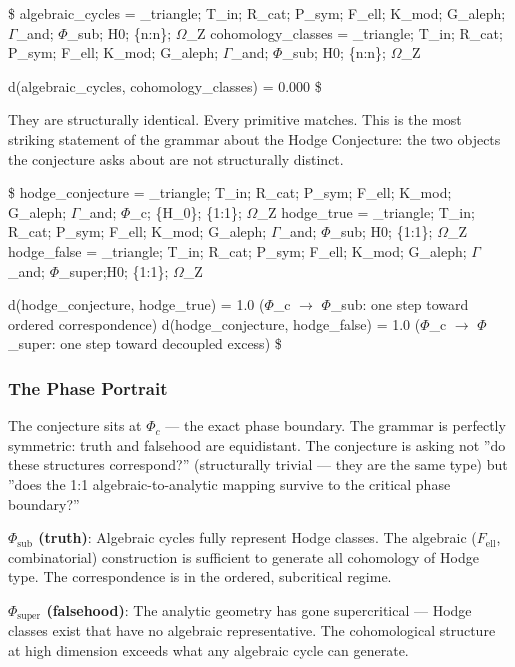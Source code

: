 \documentclass[12pt,a4paper]{article}
\begin{document}
\$
algebraic\_cycles   = \langleD\_triangle; T\_in; R\_cat; P\_sym; F\_ell; K\_mod; G\_aleph; $\Gamma$\_and; $\Phi$\_sub; H0; \{n:n\}; $\Omega$\_Z\rangle
cohomology\_classes = \langleD\_triangle; T\_in; R\_cat; P\_sym; F\_ell; K\_mod; G\_aleph; $\Gamma$\_and; $\Phi$\_sub; H0; \{n:n\}; $\Omega$\_Z\rangle

d(algebraic\_cycles, cohomology\_classes) = 0.000
\$

They are structurally identical. Every primitive matches. This is the most striking statement of the grammar about the Hodge Conjecture: the two objects the conjecture asks about are not structurally distinct.

\$
hodge\_conjecture = \langleD\_triangle; T\_in; R\_cat; P\_sym; F\_ell; K\_mod; G\_aleph; $\Gamma$\_and; $\Phi$\_c;   \{H\_0\}; \{1:1\}; $\Omega$\_Z\rangle
hodge\_true       = \langleD\_triangle; T\_in; R\_cat; P\_sym; F\_ell; K\_mod; G\_aleph; $\Gamma$\_and; $\Phi$\_sub; H0; \{1:1\}; $\Omega$\_Z\rangle
hodge\_false      = \langleD\_triangle; T\_in; R\_cat; P\_sym; F\_ell; K\_mod; G\_aleph; $\Gamma$\_and; $\Phi$\_super;H0; \{1:1\}; $\Omega$\_Z\rangle

d(hodge\_conjecture, hodge\_true)  = 1.0  ($\Phi$\_c $\rightarrow$ $\Phi$\_sub: one step toward ordered correspondence)
d(hodge\_conjecture, hodge\_false) = 1.0  ($\Phi$\_c $\rightarrow$ $\Phi$\_super: one step toward decoupled excess)
\$

\subsubsection{The Phase Portrait}

The conjecture sits at $\Phi_c$ --- the exact phase boundary. The grammar is perfectly symmetric: truth and falsehood are equidistant. The conjecture is asking not ''do these structures correspond?'' (structurally trivial --- they are the same type) but ''does the 1:1 algebraic-to-analytic mapping survive to the critical phase boundary?''

\textbf{$\Phi_{\text{sub}}$ (truth)}: Algebraic cycles fully represent Hodge classes. The algebraic ($F_{\text{ell}}$, combinatorial) construction is sufficient to generate all cohomology of Hodge type. The correspondence is in the ordered, subcritical regime.

\textbf{$\Phi_{\text{super}}$ (falsehood)}: The analytic geometry has gone supercritical --- Hodge classes exist that have no algebraic representative. The cohomological structure at high dimension exceeds what any algebraic cycle can generate.
\end{document}
